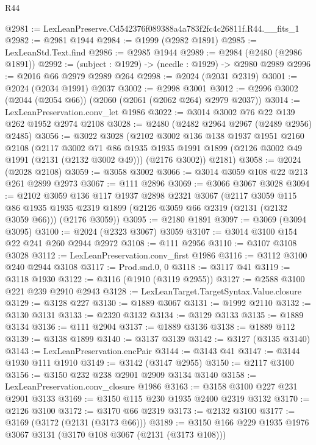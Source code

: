 \begin{lexlean}{R44}
\begin{coremodule}
@2981 := LexLeanPreserve.Cd542376f089388a4a783f2fc4c26811f.R44.__fits_1
@2982 := @2981 @1944
@2984 := @1999 (@2982 @1891)
@2985 := LexLeanStd.Text.find
@2986 := @2985 @1944
@2989 := @2984 (@2480 (@2986 @1891))
@2992 := (subject : @1929) -> (needle : @1929) -> @2980 @2989
@2996 := @2016 @66 @2979 @2989 @264
@2998 := @2024 (@2031 @2319)
@3001 := @2024 (@2034 @1991) @2037
@3002 := @2998 @3001
@3012 := @2996 @3002 (@2044 (@2054 @66)) (@2060 (@2061 (@2062 @264) @2979 @2037))
@3014 := LexLeanPreservation.conv_let @1986
@3022 := @3014 @3002 @76 @22 @139 @262 @1952 @2974 @2108
@3028 := @2480 (@2482 @2964 @2967 (@2489 @2956) @2485)
@3056 := @3022
    @3028
    (@2102
      @3002
      @136
      @138
      @1937
      @1951
      @2160
      @2108
      (@2117
        @3002
        @71
        @86
        @1935
        @1935
        @1991
        @1899
        (@2126 @3002 @49 @1991 (@2131 (@2132 @3002 @49)))
        (@2176 @3002))
      @2181)
@3058 := @2024 (@2028 @2108)
@3059 := @3058 @3002
@3066 := @3014 @3059 @108 @22 @213 @261 @2899 @2973
@3067 := @111 @2896
@3069 := @3066 @3067 @3028
@3094 := @2102
    @3059
    @136
    @117
    @1937
    @2898
    @2321
    @3067
    (@2117
      @3059
      @115
      @86
      @1935
      @1935
      @2319
      @1899
      (@2126 @3059 @66 @2319 (@2131 (@2132 @3059 @66)))
      (@2176 @3059))
@3095 := @2180 @1891
@3097 := @3069 (@3094 @3095)
@3100 := @2024 (@2323 @3067) @3059
@3107 := @3014 @3100 @154 @22 @241 @260 @2944 @2972
@3108 := @111 @2956
@3110 := @3107 @3108 @3028
@3112 := LexLeanPreservation.conv_first @1986
@3116 := @3112 @3100 @240 @2944 @3108
@3117 := Prod.snd.{0, 0}
@3118 := @3117 @41
@3119 := @3118 @1930
@3122 := @3116 (@1910 (@3119 @2955))
@3127 := @2588 @3100 @221 @239 @2910 @2943
@3128 := LexLeanTarget.TargetSyntax.Value.closure
@3129 := @3128 @227
@3130 := @1889 @3067
@3131 := @1992 @2110
@3132 := @3130 @3131
@3133 := @2320 @3132
@3134 := @3129 @3133
@3135 := @1889 @3134
@3136 := @111 @2904
@3137 := @1889 @3136
@3138 := @1889 @112
@3139 := @3138 @1899
@3140 := @3137 @3139
@3142 := @3127 (@3135 @3140)
@3143 := LexLeanPreservation.encPair
@3144 := @3143 @41
@3147 := @3144 @1930 @111 @1910
@3149 := @3142 (@3147 @2955)
@3150 := @2117 @3100
@3156 := @3150 @232 @238 @2901 @2909 @3134 @3140
@3158 := LexLeanPreservation.conv_closure @1986
@3163 := @3158 @3100 @227 @231 @2901 @3133
@3169 := @3150 @115 @230 @1935 @2400 @2319 @3132
@3170 := @2126 @3100
@3172 := @3170 @66 @2319
@3173 := @2132 @3100
@3177 := @3169 (@3172 (@2131 (@3173 @66)))
@3189 := @3150 @166 @229 @1935 @1976 @3067 @3131 (@3170 @108 @3067 (@2131 (@3173 @108)))

\end{coremodule}
\end{lexlean}
